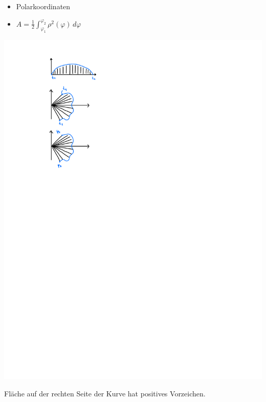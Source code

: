         \begin{minipage}{0.99\linewidth}
            \begin{minipage}{0.65\linewidth}
                \begin{itemize}
                    \item Polarkoordinaten
                    \item[] $ \displaystyle A= \frac{1}{2} \int_{\varphi_1}^{\varphi_2} \rho^2(\varphi) \, d\varphi $
                \end{itemize}
            \end{minipage}
            \begin{minipage}{0.34\linewidth}
                \includegraphics[width=0.6\linewidth]{src/Integralrechnung/polar.pdf}
            \end{minipage}
        \end{minipage}
        {\scriptsize Fläche auf der rechten Seite der Kurve hat positives Vorzeichen.}